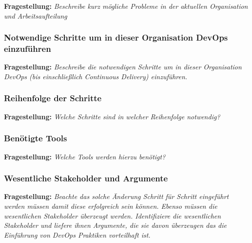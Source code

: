 \textbf{Fragestellung:} \textit{Beschreibe kurz mögliche Probleme in der aktuellen Organisation und Arbeitsaufteilung}
    

\subsubsection{Notwendige Schritte um in dieser Organisation DevOps einzuführen}
\textbf{Fragestellung:} \textit{Beschreibe die notwendigen Schritte um in dieser Organisation DevOps (bis einschließlich
Continuous Delivery) einzuführen.}



\subsubsection{Reihenfolge der Schritte}

\textbf{Fragestellung:} \textit{Welche Schritte sind in welcher Reihenfolge notwendig?}



\subsubsection{Benötigte Tools}

\textbf{Fragestellung:} \textit{Welche Tools werden hierzu benötigt?}

\subsubsection{Wesentliche Stakeholder und Argumente}

\textbf{Fragestellung:} \textit{Beachte das solche Änderung Schritt für Schritt eingeführt werden müssen damit diese
erfolgreich sein können. Ebenso müssen die wesentlichen Stakeholder überzeugt werden.
Identifiziere die wesentlichen Stakeholder und liefere ihnen Argumente, die sie davon
überzeugen das die Einführung von DevOps Praktiken vorteilhaft ist.}



